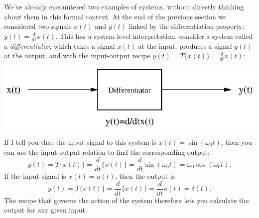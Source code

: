 \documentclass[10pt]{beamer}
\begin{document}
We've already encountered two examples of systems, without directly thinking about them in this formal context.  At the end of the previous section we considered two signals $x(t)$ and $y(t)$ linked by the differentiation property:  $y(t) = \frac{d}{dt} x(t)$.  This has a system-level interpretation:  consider a system called a {\em differentiator}, which takes a signal $x(t)$ at the input, produces a signal $y(t)$ at the output, and with the input-output recipe $y(t) = T\{x(t)\} = \frac{d}{dt} x(t)$:
\begin{center}
  \includegraphics{differentiatorsystem}
\end{center}
If I tell you that the input signal to this system is $x(t) = \sin(\omega_0 t)$, then you can use the input-output relation to find the corresponding output:
\begin{equation*}
  y(t) = T\{x(t)\} = \frac{d}{dt} \{x(t)\} = \frac{d}{dt} \sin(\omega_0 t) = \omega_0 \cos(\omega_0 t).
\end{equation*}
If the input signal is $x(t) = u(t)$, then the output is
\begin{equation*}
  y(t) = T\{x(t)\} = \frac{d}{dt} \{x(t)\} = \frac{d}{dt} u(t) =\delta(t).
\end{equation*}
The recipe that governs the action of the system therefore lets you calculate the output for any given input.
\end{document}
